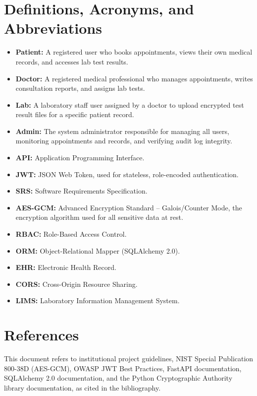 \documentclass[a4paper,12pt]{report}
\begin{document}
\section{Definitions, Acronyms, and Abbreviations}

\begin{itemize}
    \item \textbf{Patient:} A registered user who books appointments, views their own medical records, and accesses lab test results.
    \item \textbf{Doctor:} A registered medical professional who manages appointments, writes consultation reports, and assigns lab tests.
    \item \textbf{Lab:} A laboratory staff user assigned by a doctor to upload encrypted test result files for a specific patient record.
    \item \textbf{Admin:} The system administrator responsible for managing all users, monitoring appointments and records, and verifying audit log integrity.
    \item \textbf{API:} Application Programming Interface.
    \item \textbf{JWT:} JSON Web Token, used for stateless, role-encoded authentication.
    \item \textbf{SRS:} Software Requirements Specification.
    \item \textbf{AES-GCM:} Advanced Encryption Standard -- Galois/Counter Mode, the encryption algorithm used for all sensitive data at rest.
    \item \textbf{RBAC:} Role-Based Access Control.
    \item \textbf{ORM:} Object-Relational Mapper (SQLAlchemy 2.0).
    \item \textbf{EHR:} Electronic Health Record.
    \item \textbf{CORS:} Cross-Origin Resource Sharing.
    \item \textbf{LIMS:} Laboratory Information Management System.
\end{itemize}

\section{References}

This document refers to institutional project guidelines, NIST Special Publication 800-38D (AES-GCM), OWASP JWT Best Practices, FastAPI documentation, SQLAlchemy 2.0 documentation, and the Python Cryptographic Authority library documentation, as cited in the bibliography.
\end{document}
